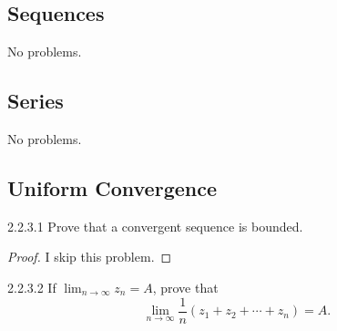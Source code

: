 \subsection{Sequences}

No problems.

\subsection{Series}

No problems.

\subsection{Uniform Convergence}

\begin{problem}{2.2.3.1}
Prove that a convergent sequence is bounded.
\end{problem}

\begin{proof}
	I skip this problem.
\end{proof}

\begin{problem}{2.2.3.2}
If \( \lim_{n \to \infty} z_{n} = A \), prove that
\[
	\lim\limits_{n \to \infty} \frac{1}{n}(z_{1} + z_{2} + \cdots + z_{n}) = A.
\]
\end{problem}

